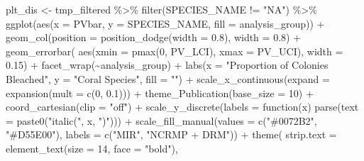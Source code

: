 \documentclass[
]{article}
\newenvironment{Shaded}{\begin{snugshade}}{\end{snugshade}}
\newcommand{\AttributeTok}[1]{\textcolor[rgb]{0.40,0.45,0.13}{#1}}
\newcommand{\ControlFlowTok}[1]{\textcolor[rgb]{0.00,0.23,0.31}{#1}}
\newcommand{\DecValTok}[1]{\textcolor[rgb]{0.68,0.00,0.00}{#1}}
\newcommand{\FloatTok}[1]{\textcolor[rgb]{0.68,0.00,0.00}{#1}}
\newcommand{\FunctionTok}[1]{\textcolor[rgb]{0.28,0.35,0.67}{#1}}
\newcommand{\NormalTok}[1]{\textcolor[rgb]{0.00,0.23,0.31}{#1}}
\newcommand{\OtherTok}[1]{\textcolor[rgb]{0.00,0.23,0.31}{#1}}
\newcommand{\SpecialCharTok}[1]{\textcolor[rgb]{0.37,0.37,0.37}{#1}}
\newcommand{\StringTok}[1]{\textcolor[rgb]{0.13,0.47,0.30}{#1}}
\begin{document}
\begin{Shaded}
\begin{Highlighting}[]
\NormalTok{plt\_dis }\OtherTok{\textless{}{-}}\NormalTok{ tmp\_filtered }\SpecialCharTok{\%\textgreater{}\%}
  \FunctionTok{filter}\NormalTok{(SPECIES\_NAME }\SpecialCharTok{!=} \StringTok{"NA"}\NormalTok{) }\SpecialCharTok{\%\textgreater{}\%}
  \FunctionTok{ggplot}\NormalTok{(}\FunctionTok{aes}\NormalTok{(}\AttributeTok{x =}\NormalTok{ PVbar, }\AttributeTok{y =}\NormalTok{ SPECIES\_NAME, }\AttributeTok{fill =}\NormalTok{ analysis\_group)) }\SpecialCharTok{+}
  \FunctionTok{geom\_col}\NormalTok{(}\AttributeTok{position =} \FunctionTok{position\_dodge}\NormalTok{(}\AttributeTok{width =} \FloatTok{0.8}\NormalTok{), }\AttributeTok{width =} \FloatTok{0.8}\NormalTok{) }\SpecialCharTok{+}
  \FunctionTok{geom\_errorbar}\NormalTok{(}
    \FunctionTok{aes}\NormalTok{(}\AttributeTok{xmin =} \FunctionTok{pmax}\NormalTok{(}\DecValTok{0}\NormalTok{, PV\_LCI), }\AttributeTok{xmax =}\NormalTok{ PV\_UCI),}
    \AttributeTok{width =} \FloatTok{0.15}\NormalTok{) }\SpecialCharTok{+}
  \FunctionTok{facet\_wrap}\NormalTok{(}\SpecialCharTok{\textasciitilde{}}\NormalTok{analysis\_group) }\SpecialCharTok{+}
    \FunctionTok{labs}\NormalTok{(}\AttributeTok{x =} \StringTok{"Proportion of Colonies Bleached"}\NormalTok{, }\AttributeTok{y =} \StringTok{"Coral Species"}\NormalTok{, }\AttributeTok{fill =} \StringTok{""}\NormalTok{) }\SpecialCharTok{+}
    \FunctionTok{scale\_x\_continuous}\NormalTok{(}\AttributeTok{expand =} \FunctionTok{expansion}\NormalTok{(}\AttributeTok{mult =} \FunctionTok{c}\NormalTok{(}\DecValTok{0}\NormalTok{, }\FloatTok{0.1}\NormalTok{))) }\SpecialCharTok{+}
        \FunctionTok{theme\_Publication}\NormalTok{(}\AttributeTok{base\_size =} \DecValTok{10}\NormalTok{) }\SpecialCharTok{+}
    \FunctionTok{coord\_cartesian}\NormalTok{(}\AttributeTok{clip =} \StringTok{"off"}\NormalTok{) }\SpecialCharTok{+}
        \FunctionTok{scale\_y\_discrete}\NormalTok{(}\AttributeTok{labels =} \ControlFlowTok{function}\NormalTok{(x) }\FunctionTok{parse}\NormalTok{(}\AttributeTok{text =} \FunctionTok{paste0}\NormalTok{(}\StringTok{"italic(\textquotesingle{}"}\NormalTok{, x, }\StringTok{"\textquotesingle{})"}\NormalTok{))) }\SpecialCharTok{+}
   \FunctionTok{scale\_fill\_manual}\NormalTok{(}\AttributeTok{values =} \FunctionTok{c}\NormalTok{(}\StringTok{"\#0072B2"}\NormalTok{, }\StringTok{"\#D55E00"}\NormalTok{), }\AttributeTok{labels =} \FunctionTok{c}\NormalTok{(}\StringTok{"MIR"}\NormalTok{, }\StringTok{"NCRMP + DRM"}\NormalTok{)) }\SpecialCharTok{+}
    \FunctionTok{theme}\NormalTok{(}
          \AttributeTok{strip.text =} \FunctionTok{element\_text}\NormalTok{(}\AttributeTok{size =} \DecValTok{14}\NormalTok{, }\AttributeTok{face =} \StringTok{"bold"}\NormalTok{),}

\end{Highlighting}
\end{Shaded}
\end{document}
